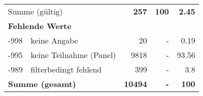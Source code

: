 \begin{longtable}{lXrrr}
     \midrule
     \multicolumn{2}{l}{Summe (gültig)} &
       \textbf{\num{257}} &
     \textbf{\num{100}} &
       \textbf{\num[round-mode=places,round-precision=2]{2.45}} \\
     \multicolumn{5}{l}{\textbf{Fehlende Werte}}\\
       -998 &
       keine Angabe &
         \num{20} &
        - &
         \num[round-mode=places,round-precision=2]{0.19} \\
       -995 &
       keine Teilnahme (Panel) &
         \num{9818} &
        - &
         \num[round-mode=places,round-precision=2]{93.56} \\
       -989 &
       filterbedingt fehlend &
         \num{399} &
        - &
         \num[round-mode=places,round-precision=2]{3.8} \\
     \midrule
     \multicolumn{2}{l}{\textbf{Summe (gesamt)}} &
          \textbf{\num{10494}} &
        \textbf{-} &
        \textbf{\num{100}} \\
     \bottomrule
     \end{longtable}
     
